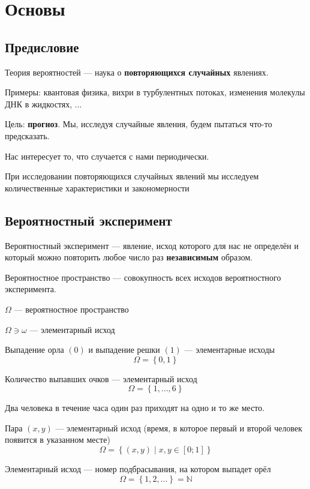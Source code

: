 \chapter{Основы}

\section{Предисловие}
Теория вероятностей --- наука о \textbf{повторяющихся случайных} явлениях.

Примеры: квантовая физика, вихри в турбулентных потоках,
изменения молекулы ДНК в жидкостях, ...

Цель: \textbf{прогноз}. Мы, исследуя случайные явления,
будем пытаться что-то предсказать.

Нас интересует то, что случается с нами периодически.

При исследовании повторяющихся случайных явлений мы исследуем
количественные характеристики и закономерности

\section{Вероятностный эксперимент}
\begin{definition}
Вероятностный эксперимент --- явление, исход которого для нас не определён
и который можно повторить любое число раз \textbf{независимым} образом.
\end{definition}
\begin{definition}
Вероятностное пространство --- совокупность всех исходов
вероятностного эксперимента.
\end{definition}
$\Omega$ --- вероятностное пространство

$\Omega \ni \omega$ --- элементарный исход

\begin{example}
Выпадение орла $\left( 0 \right)$
и выпадение решки $\left( 1 \right)$ --- элементарные исходы
$$\Omega = \left\{ 0, 1 \right\}$$
\end{example}
\begin{example}
Количество выпавших очков --- элементарный исход
$$\Omega = \left\{ 1, \dots, 6 \right\}$$
\end{example}
\begin{example}
Два человека в течение часа один раз приходят на одно и то же место.

Пара $\left( x,y \right)$ --- элементарный исход
(время, в которое первый и второй человек появится в указанном месте)
$$\Omega = \left\{ \left(x,y\right) \mid x,y \in [0;1] \right\}$$
\end{example}
\begin{example}
    Элементарный исход --- номер подбрасывания, на котором выпадет орёл
$$\Omega = \left\{ 1,2, \dots \right\} =  \mathbb{N}$$
\end{example}
